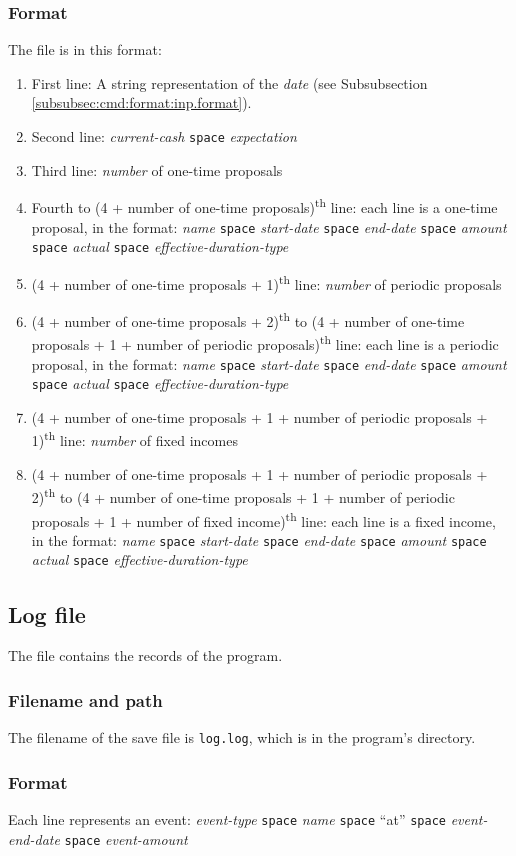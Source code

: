 \subsubsection{Format}
The file is in this format:
\begin{enumerate}
	\item First line: A string representation of the \emph{date} (see Subsubsection \ref{subsubsec:cmd:format:inp.format}).
	\item Second line: \emph{current-cash} \texttt{space} \emph{expectation}
	\item Third line: \emph{number} of one-time proposals
	\item Fourth to (4 + number of one-time proposals)\textsuperscript{th} line: each line is a one-time proposal, in the format: \emph{name} \texttt{space} \emph{start-date} \texttt{space} \emph{end-date} \texttt{space} \emph{amount} \texttt{space} \emph{actual} \texttt{space} \emph{effective-duration-type} 
	\item (4 + number of one-time proposals + 1)\textsuperscript{th} line: \emph{number} of periodic proposals
	\item (4 + number of one-time proposals + 2)\textsuperscript{th} to (4 + number of one-time proposals + 1 + number of periodic proposals)\textsuperscript{th} line: each line is a periodic proposal, in the format: \emph{name} \texttt{space} \emph{start-date} \texttt{space} \emph{end-date} \texttt{space} \emph{amount} \texttt{space} \emph{actual} \texttt{space} \emph{effective-duration-type} 
	\item (4 + number of one-time proposals + 1 + number of periodic proposals + 1)\textsuperscript{th} line: \emph{number} of fixed incomes
	\item (4 + number of one-time proposals + 1 + number of periodic proposals + 2)\textsuperscript{th} to (4 + number of one-time proposals + 1 + number of periodic proposals + 1 + number of fixed income)\textsuperscript{th} line: each line is a fixed income, in the format: \emph{name} \texttt{space} \emph{start-date} \texttt{space} \emph{end-date} \texttt{space} \emph{amount} \texttt{space} \emph{actual} \texttt{space} \emph{effective-duration-type} 
\end{enumerate}

\subsection{Log file}
The file contains the records of the program.

\subsubsection{Filename and path}
The filename of the save file is \texttt{log.log}, which is in the program's directory.

\subsubsection{Format}
Each line represents an event: \emph{event-type} \texttt{space} \emph{name} \texttt{space} ``at'' \texttt{space} \emph{event-end-date} \texttt{space} \emph{event-amount} 